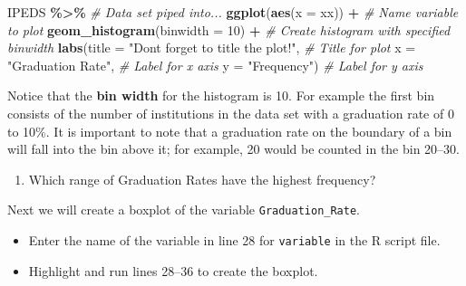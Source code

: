 \documentclass[
]{report}
\newenvironment{Shaded}{\begin{snugshade}}{\end{snugshade}}
\newcommand{\AttributeTok}[1]{\textcolor[rgb]{0.13,0.29,0.53}{#1}}
\newcommand{\CommentTok}[1]{\textcolor[rgb]{0.56,0.35,0.01}{\textit{#1}}}
\newcommand{\DecValTok}[1]{\textcolor[rgb]{0.00,0.00,0.81}{#1}}
\newcommand{\FunctionTok}[1]{\textcolor[rgb]{0.13,0.29,0.53}{\textbf{#1}}}
\newcommand{\NormalTok}[1]{#1}
\newcommand{\SpecialCharTok}[1]{\textcolor[rgb]{0.81,0.36,0.00}{\textbf{#1}}}
\newcommand{\StringTok}[1]{\textcolor[rgb]{0.31,0.60,0.02}{#1}}
\providecommand{\tightlist}{%
  \setlength{\itemsep}{0pt}\setlength{\parskip}{0pt}}
\begin{document}
\begin{Shaded}
\begin{Highlighting}[]
\NormalTok{IPEDS }\SpecialCharTok{\%\textgreater{}\%} \CommentTok{\# Data set piped into...}
\FunctionTok{ggplot}\NormalTok{(}\FunctionTok{aes}\NormalTok{(}\AttributeTok{x =}\NormalTok{ xx)) }\SpecialCharTok{+}   \CommentTok{\# Name variable to plot}
  \FunctionTok{geom\_histogram}\NormalTok{(}\AttributeTok{binwidth =} \DecValTok{10}\NormalTok{) }\SpecialCharTok{+}  \CommentTok{\# Create histogram with specified binwidth}
  \FunctionTok{labs}\NormalTok{(}\AttributeTok{title =} \StringTok{"Don\textquotesingle{}t forget to title the plot!"}\NormalTok{, }\CommentTok{\# Title for plot}
       \AttributeTok{x =} \StringTok{"Graduation Rate"}\NormalTok{, }\CommentTok{\# Label for x axis}
       \AttributeTok{y =} \StringTok{"Frequency"}\NormalTok{) }\CommentTok{\# Label for y axis}
\end{Highlighting}
\end{Shaded}

Notice that the \textbf{bin width} for the histogram is 10. For example the first bin consists of the number of institutions in the data set with a graduation rate of 0 to 10\%. It is important to note that a graduation rate on the boundary of a bin will fall into the bin above it; for example, 20 would be counted in the bin 20--30.

\begin{enumerate}
\def\labelenumi{\arabic{enumi}.}
\setcounter{enumi}{5}
\tightlist
\item
  Which range of Graduation Rates have the highest frequency?
\end{enumerate}

\vspace{0.3in}

Next we will create a boxplot of the variable \texttt{Graduation\_Rate}.

\begin{itemize}
\item
  Enter the name of the variable in line 28 for \texttt{variable} in the R script file.
\item
  Highlight and run lines 28--36 to create the boxplot.
\end{itemize}
\end{document}
